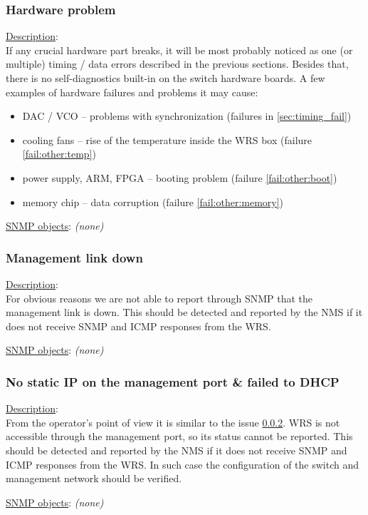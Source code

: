 \subsubsection{\bf Hardware problem}
		\begin{pck_descr}
			\item [] \underline{Description}:\\
				If any crucial hardware part breaks, it will be most probably noticed
        as one (or multiple) timing / data errors described in the previous
        sections. Besides that, there is no self-diagnostics built-in on the
        switch hardware boards. A few examples of hardware failures and problems
        it may cause:
				\begin{itemize}
          \item DAC / VCO -- problems with synchronization (failures in
            \ref{sec:timing_fail})
					\item cooling fans -- rise of the temperature inside the WRS box
						(failure \ref{fail:other:temp})
					\item power supply, ARM, FPGA -- booting problem (failure
						\ref{fail:other:boot})
					\item memory chip -- data corruption (failure \ref{fail:other:memory})
				\end{itemize}
			\item [] \underline{SNMP objects}: \emph{(none)}
		\end{pck_descr}

\subsubsection{\bf Management link down}
		\label{fail:other:management_link}
		\begin{pck_descr}
			\item [] \underline{Description}:\\
				For obvious reasons we are not able to report through SNMP that the
				management link is down. This should be detected and reported by the NMS
				if it does not receive SNMP and ICMP responses from the WRS.
			\item [] \underline{SNMP objects}: \emph{(none)}
		\end{pck_descr}

\subsubsection{\bf No static IP on the management port \& failed to DHCP}
		\begin{pck_descr}
			\item [] \underline{Description}:\\
				From the operator's point of view it is similar to the issue
				\ref{fail:other:management_link}. WRS is not accessible through the
				management port, so its status cannot be reported. This should be
				detected and reported by the NMS if it does not receive SNMP and ICMP
				responses from the WRS. In such case the configuration of the switch and
        management network should be verified.
			\item [] \underline{SNMP objects}: \emph{(none)}
		\end{pck_descr}

